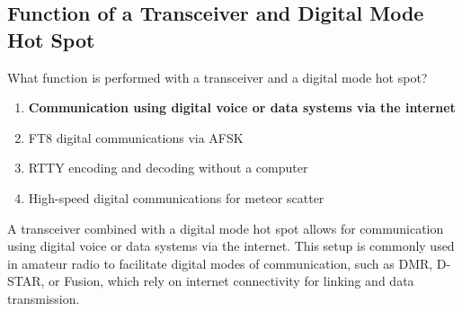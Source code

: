 \subsection{Function of a Transceiver and Digital Mode Hot Spot}
\label{T4A10}

\begin{tcolorbox}[colback=gray!10!white,colframe=black!75!black,title=T4A10]
What function is performed with a transceiver and a digital mode hot spot?
\begin{enumerate}[noitemsep]
    \item \textbf{Communication using digital voice or data systems via the internet}
    \item FT8 digital communications via AFSK
    \item RTTY encoding and decoding without a computer
    \item High-speed digital communications for meteor scatter
\end{enumerate}
\end{tcolorbox}

A transceiver combined with a digital mode hot spot allows for communication using digital voice or data systems via the internet. This setup is commonly used in amateur radio to facilitate digital modes of communication, such as DMR, D-STAR, or Fusion, which rely on internet connectivity for linking and data transmission.